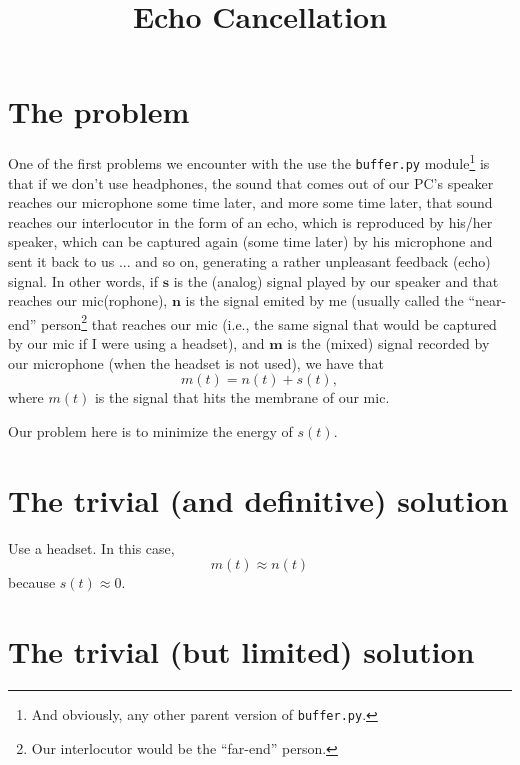
\title{Echo Cancellation}

\maketitle


\section{The problem}

One of the first problems we encounter with the use the
\texttt{buffer.py} module\footnote{And obviously, any other parent
  version of \texttt{buffer.py}.} is that if we don't use headphones,
the sound that comes out of our PC's speaker reaches our microphone
some time later, and more some time later, that sound reaches our
interlocutor in the form of an echo, which is reproduced by his/her
speaker, which can be captured again (some time later) by his
microphone and sent it back to us ... and so on, generating a rather
unpleasant feedback (echo) signal. In other words, if ${\mathbf s}$ is
the (analog) signal played by our speaker and that reaches our
mic(rophone), ${\mathbf n}$ is the signal emited by me (usually called
the ``near-end'' person\footnote{Our interlocutor would be the
  ``far-end'' person.} that reaches our mic (i.e., the same signal
that would be captured by our mic if I were using a headset), and
${\mathbf m}$ is the (mixed) signal recorded by our microphone (when
the headset is not used), we have that
\begin{equation}
  m(t) = n(t) + s(t),
  \label{eq:echo_problem}
\end{equation}
where $m(t)$ is the signal that hits the membrane of our mic.

Our problem here is to minimize the energy of $s(t)$.

\section{The trivial (and definitive) solution}

Use a headset. In this case,
\begin{equation}
  m(t) \approx n(t)
  \label{eq:headset_solution}
\end{equation}
because $s(t)\approx 0$.

\section{The trivial (but limited) solution}

